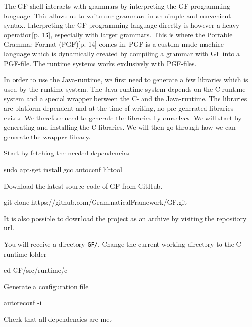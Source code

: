 The GF-shell interacts with grammars by interpreting the GF programming language. This allows us to write our grammars in an simple and convenient syntax. Interpreting the GF programming language directly is however a heavy operation\cite{angelov:2011}[p. 13], especially with larger grammars. This is where the Portable Grammar Format (PGF)\cite{angelov:2011}[p. 14] comes in. PGF is a custom made machine language which is dynamically created by compiling a grammar with GF into a PGF-file. The runtime systems works exclusively with PGF-files.

In order to use the Java-runtime, we first need to generate a few libraries which is used by the runtime system. The Java-runtime system depends on the C-runtime system and a special wrapper between the C- and the Java-runtime. The libraries are platform dependent and at the time of writing, no pre-generated libraries exists. We therefore need to generate the libraries by ourselves. We will start by generating and installing the C-libraries. We will then go through how we can generate the wrapper library.

Start by fetching the needed dependencies

\begin{terminal}
sudo apt-get install gcc autoconf libtool
\end{terminal}

Download the latest source code of GF from GitHub.

\begin{terminal}
git clone https://github.com/GrammaticalFramework/GF.git
\end{terminal}

It is also possible to download the project as an archive by visiting the repository url.

You will receive a directory \texttt{GF/}. Change the current working directory to the C-runtime folder.

\begin{terminal}
cd GF/src/runtime/c
\end{terminal}

Generate a configuration file

\begin{terminal}
autoreconf -i
\end{terminal}

Check that all dependencies are met

